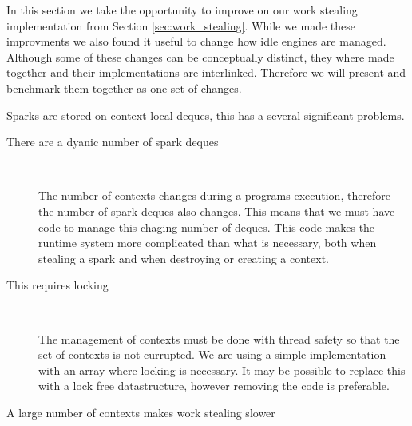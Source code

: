 

In this section we take the opportunity to improve on our work stealing
implementation from Section \ref{sec:work_stealing}.
While we made these improvments we also found it useful to change how idle
engines are managed.
Although some of these changes can be conceptually distinct,
they where made together and their implementations are interlinked.
Therefore we will present and benchmark them together as one set of changes.

Sparks are stored on context local deques,
this has a several significant problems.

\begin{description}

    \item[There are a dyanic number of spark deques]~

    The number of contexts changes during a programs execution,
    therefore the number of spark deques also changes.
    This means that we must have code to manage this chaging number of
    deques.
    This code makes the runtime system more complicated than what is
    necessary,
    both when stealing a spark and when destroying or creating a context.

    \item[This requires locking]~

    The management of contexts must be done with thread safety so that the
    set of contexts is not currupted.
    We are using a simple implementation with an array where locking is
    necessary.
    It may be possible to replace this with a lock free datastructure,
    however removing the code is preferable.

    \item[A large number of contexts makes work stealing slower]~
    

\end{description}
